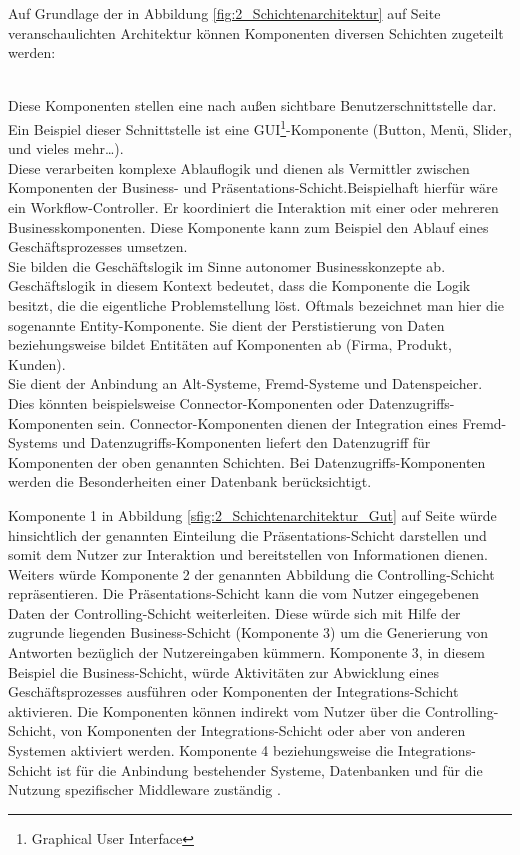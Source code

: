 Auf Grundlage der in Abbildung \ref{fig:2_Schichtenarchitektur} auf Seite \pageref{fig:2_Schichtenarchitektur} veranschaulichten Architektur können Komponenten diversen Schichten zugeteilt werden:
\begin{enumerate}
 \hfill \\
Diese Komponenten stellen eine nach außen sichtbare Benutzerschnittstelle dar. Ein Beispiel dieser Schnittstelle ist eine GUI\footnote{Graphical User Interface}-Komponente (Button, Menü, Slider, und vieles mehr\ldots).
 \hfill \\
Diese verarbeiten komplexe Ablauflogik und dienen als Vermittler zwischen Komponenten der Business- und Präsentations-Schicht.Beispielhaft hierfür wäre ein Workflow-Controller. Er koordiniert die Interaktion mit einer oder mehreren Businesskomponenten. Diese Komponente kann zum Beispiel den Ablauf eines Geschäftsprozesses umsetzen.
 \hfill \\
Sie bilden die Geschäftslogik im Sinne autonomer Businesskonzepte ab. Geschäftslogik in diesem Kontext bedeutet, dass die Komponente die Logik besitzt, die die eigentliche Problemstellung löst. Oftmals bezeichnet man hier die sogenannte Entity-Komponente. Sie dient der Perstistierung von Daten beziehungsweise bildet Entitäten auf Komponenten ab (Firma, Produkt, Kunden).
 \hfill \\
Sie dient der Anbindung an Alt-Systeme, Fremd-Systeme und Datenspeicher. Dies könnten beispielsweise Connector-Komponenten oder Datenzugriffs-Komponenten sein. Connector-Komponenten dienen der Integration eines Fremd-Systems und Datenzugriffs-Komponenten liefert den Datenzugriff für Komponenten der oben genannten Schichten. Bei Datenzugriffs-Komponenten werden die Besonderheiten einer Datenbank berücksichtigt.
\end{enumerate}

Komponente 1 in Abbildung \ref{sfig:2_Schichtenarchitektur_Gut} auf Seite \pageref{sfig:2_Schichtenarchitektur_Gut} würde hinsichtlich der genannten Einteilung die Präsentations-Schicht darstellen und somit dem Nutzer zur Interaktion und bereitstellen von Informationen dienen. Weiters würde Komponente 2 der genannten Abbildung die Controlling-Schicht repräsentieren. Die Präsentations-Schicht kann die vom Nutzer eingegebenen Daten der Controlling-Schicht weiterleiten. Diese würde sich mit Hilfe der zugrunde liegenden Business-Schicht (Komponente 3) um die Generierung von Antworten bezüglich der Nutzereingaben kümmern. Komponente 3, in diesem Beispiel die Business-Schicht, würde Aktivitäten zur Abwicklung eines Geschäftsprozesses ausführen oder Komponenten der Integrations-Schicht aktivieren. Die Komponenten können indirekt vom Nutzer über die Controlling-Schicht, von Komponenten der Integrations-Schicht oder aber von anderen Systemen aktiviert werden. Komponente 4 beziehungsweise die Integrations-Schicht ist für die Anbindung bestehender Systeme, Datenbanken und für die Nutzung spezifischer Middleware zuständig \citereset \autocite{Andresen.2003}.

